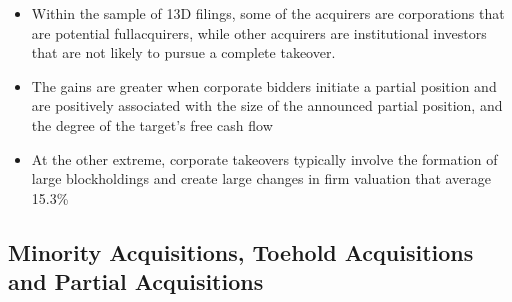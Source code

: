 \documentclass[12pt]{article}
\begin{document}
\begin{itemize}
        \item Within the sample of 13D filings, some of the acquirers are corporations that are potential fullacquirers, while other acquirers are institutional investors that are not likely to pursue a complete takeover. \citep{Brigida2012}

        \item The gains are greater when corporate bidders initiate a partial position and are positively associated with the size of the announced partial position, and the degree of the target’s free cash flow \citep{Akhigbe2007}

        \item At the other extreme, corporate takeovers typically involve the formation of large blockholdings and create large changes in firm valuation that average 15.3\% \citep{Denes2017}

       
    \end{itemize}

\subsection{Minority Acquisitions, Toehold Acquisitions and Partial Acquisitions}
\end{document}
